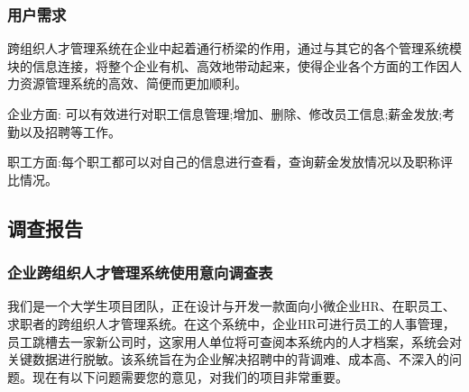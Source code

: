 \documentclass[master]{hduthesis}
\begin{document}
\subsubsection{用户需求}
跨组织人才管理系统在企业中起着通行桥梁的作用，通过与其它的各个管理系统模块的信息连接，将整个企业有机、高效地带动起来，使得企业各个方面的工作因人力资源管理系统的高效、简便而更加顺利。

企业方面: 可以有效进行对职工信息管理;增加、删除、修改员工信息;薪金发放;考勤以及招聘等工作。

职工方面:每个职工都可以对自己的信息进行查看，查询薪金发放情况以及职称评比情况。

\subsection{调查报告}
\subsubsection{企业跨组织人才管理系统使用意向调查表}
我们是一个大学生项目团队，正在设计与开发一款面向小微企业HR、在职员工、求职者的跨组织人才管理系统。在这个系统中，企业HR可进行员工的人事管理，员工跳槽去一家新公司时，这家用人单位将可查阅本系统内的人才档案，系统会对关键数据进行脱敏。该系统旨在为企业解决招聘中的背调难、成本高、不深入的问题。现在有以下问题需要您的意见，对我们的项目非常重要。
\end{document}
